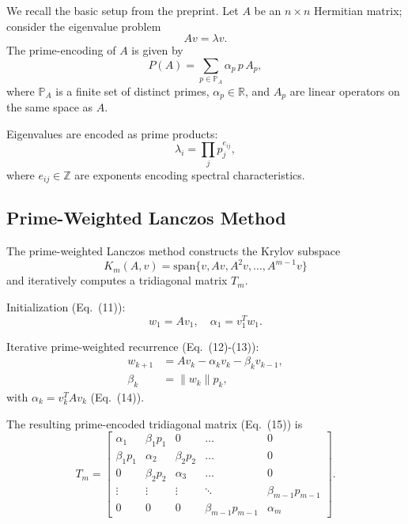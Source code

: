 \documentclass[11pt]{article}
\begin{document}
We recall the basic setup from the preprint.\cite{PrimeEigenSolvers}
Let $A$ be an $n \times n$ Hermitian matrix; consider the eigenvalue
problem
\[
A v = \lambda v.
\]
The prime-encoding of $A$ is given by
\begin{equation}
P(A) = \sum_{p\in\mathbb{P}_A} \alpha_p\, p\, A_p,
\label{eq:prime-decomp}
\end{equation}
where $\mathbb{P}_A$ is a finite set of distinct primes, $\alpha_p \in
\mathbb{R}$, and $A_p$ are linear operators on the same space as
$A$.\cite{PrimeEigenSolvers}

Eigenvalues are encoded as prime products:
\begin{equation}
\lambda_i = \prod_{j} p_j^{e_{ij}},
\label{eq:lambda-prime-encoding}
\end{equation}
where $e_{ij} \in \mathbb{Z}$ are exponents encoding spectral
characteristics.\cite{PrimeEigenSolvers}

\subsection{Prime-Weighted Lanczos Method}

The prime-weighted Lanczos method constructs the Krylov subspace
\begin{equation}
K_m(A,v) = \mathrm{span}\{v,Av,A^2 v,\dots, A^{m-1}v\}
\label{eq:Krylov}
\end{equation}
and iteratively computes a tridiagonal matrix $T_m$.\cite{PrimeEigenSolvers}

Initialization (Eq.~(11)):
\begin{equation}
w_1 = A v_1,\quad \alpha_1 = v_1^T w_1.
\end{equation}

Iterative prime-weighted recurrence (Eq.~(12)-(13)):
\begin{align}
w_{k+1} &= A v_k - \alpha_k v_k - \beta_k v_{k-1}, \label{eq:lanczos-rec}\\
\beta_k &= \|w_k\| p_k, \label{eq:beta-prime}
\end{align}
with $\alpha_k = v_k^T A v_k$ (Eq.~(14)).\cite{PrimeEigenSolvers}

The resulting prime-encoded tridiagonal matrix (Eq.~(15)) is
\begin{equation}
T_m =
\begin{bmatrix}
\alpha_1 & \beta_1 p_1 & 0 & \dots & 0 \\
\beta_1 p_1 & \alpha_2 & \beta_2 p_2 & \dots & 0 \\
0 & \beta_2 p_2 & \alpha_3 & \dots & 0 \\
\vdots & \vdots & \vdots & \ddots & \beta_{m-1}p_{m-1} \\
0 & 0 & 0 & \beta_{m-1}p_{m-1} & \alpha_m
\end{bmatrix}.
\label{eq:Tm}
\end{equation}
\end{document}

